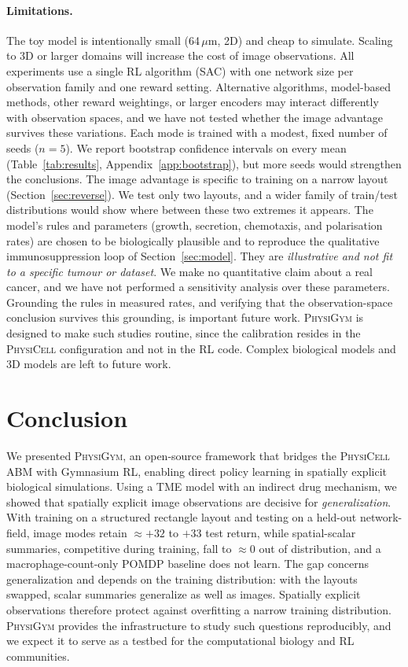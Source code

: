 \documentclass{article}
\newcommand{\physigym}{\textsc{PhysiGym}}
\newcommand{\physicell}{\textsc{PhysiCell}}
\begin{document}
\paragraph{Limitations.}
The toy model is intentionally small (64\,$\mu$m, 2D) and cheap to simulate.
Scaling to 3D or larger domains will increase the cost of image observations.
All experiments use a single RL algorithm (SAC) with one network size per
observation family and one reward setting. Alternative algorithms, model-based
methods, other reward weightings, or larger encoders may interact differently
with observation spaces, and we have not tested whether the image advantage
survives these variations.
Each mode is trained with a modest, fixed number of seeds ($n=5$). We
report bootstrap confidence intervals on every mean (Table~\ref{tab:results},
Appendix~\ref{app:bootstrap}), but more seeds would strengthen the conclusions.
The image advantage is specific to training on a narrow layout
(Section~\ref{sec:reverse}). We test only two layouts, and a wider family of
train/test distributions would show where between these two extremes it appears.
The model's rules and parameters (growth, secretion, chemotaxis, and
polarisation rates) are chosen to be biologically plausible and to reproduce the
qualitative immunosuppression loop of Section~\ref{sec:model}. They are
\emph{illustrative and not fit to a specific tumour or dataset}. We make no
quantitative claim about a real cancer, and we have not performed a sensitivity
analysis over these parameters. Grounding the rules in measured rates, and
verifying that the observation-space conclusion survives this grounding, is
important future work. \physigym{} is designed to make such studies routine,
since the calibration resides in the \physicell{} configuration and not in the
RL code. Complex biological models and 3D models are left to future work.

\section{Conclusion}

We presented \physigym{}, an open-source framework that bridges the
\physicell{} ABM with Gymnasium RL, enabling direct policy learning in
spatially explicit biological simulations.
Using a TME model with an indirect drug mechanism, we showed that spatially
explicit image observations are decisive for \emph{generalization}. With
training on a structured rectangle layout and testing on a held-out
network-field, image modes retain ${\approx}{+}32$ to $+33$ test return, while
spatial-scalar summaries, competitive during training, fall to ${\approx}0$ out
of distribution, and a macrophage-count-only POMDP baseline does not learn.
The gap concerns generalization and depends on the training distribution: with
the layouts swapped, scalar summaries generalize as well as images. Spatially
explicit observations therefore protect against overfitting a narrow training
distribution.
\physigym{} provides the infrastructure to study such questions reproducibly,
and we expect it to serve as a testbed for the computational biology and RL
communities.
\end{document}

